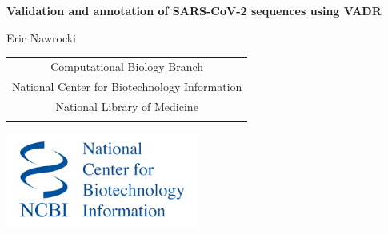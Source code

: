 \documentclass[landscape]{slides}
\begin{document}
\begin{slide}
\begin{center}
\large{\textbf{Validation and annotation of SARS-CoV-2 sequences using VADR}}

\normalsize

Eric Nawrocki \\

\medskip

\medskip

\medskip

\medskip

\medskip

\small
\begin{tabular}{c}
Computational Biology Branch \\
National Center for Biotechnology Information\\
National Library of Medicine \\
\\
\end{tabular}

\vspace{0.1in}

\includegraphics[width=2.5in]{figs/ncbi-logo}

\end{center}
\end{slide}
\end{document}

